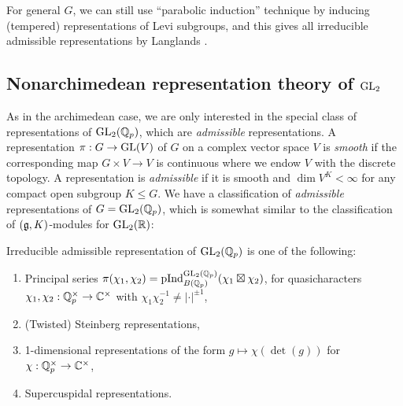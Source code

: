 For general $G$, we can still use ``parabolic induction'' technique by inducing (tempered) representations of Levi subgroups, and this gives all irreducible admissible representations by Langlands \cite[Theorem 4.9.2]{getz2023introduction}.

\subsection{Nonarchimedean representation theory of $\mathrm{GL}_2$}
\label{subsec:gl2nonarch}


As in the archimedean case, we are only interested in the special class of representations of $\mathrm{GL}_2(\mathbb{Q}_p)$, which are \emph{admissible} representations.
A representation $\pi: G \to \mathrm{GL}(V)$ of $G$ on a complex vector space $V$ is \emph{smooth} if the corresponding map $G \times V \to V$ is continuous where we endow $V$ with the discrete topology.
A representation is \emph{admissible} if it is smooth and $\dim V^K < \infty$ for any compact open subgroup $K \le G$.
We have a classification of \emph{admissible} representations of $G = \mathrm{GL}_2(\mathbb{Q}_p)$, which is somewhat similar to the classification of $(\mathfrak{g}, K)$-modules for $\mathrm{GL}_2(\mathbb{R})$:

\begin{theorem}
Irreducible admissible representation of $\mathrm{GL}_2(\mathbb{Q}_p)$ is one of the following:
\begin{enumerate}
    \item Principal series $\pi(\chi_1, \chi_2) = \mathrm{pInd}_{B(\mathbb{Q}_p)}^{\mathrm{GL}_2(\mathbb{Q}_p)}(\chi_1 \boxtimes \chi_2)$, for quasicharacters $\chi_1, \chi_2: \mathbb{Q}_p^\times \to \mathbb{C}^\times$ with $\chi_1 \chi_2^{-1} \ne |\cdot|^{\pm 1}$,
    \item (Twisted) Steinberg representations,
    \item 1-dimensional representations of the form $g \mapsto \chi(\det (g))$ for $\chi : \mathbb{Q}_p^\times \to \mathbb{C}^\times$,
    \item Supercuspidal representations.
\end{enumerate}
\end{theorem}

